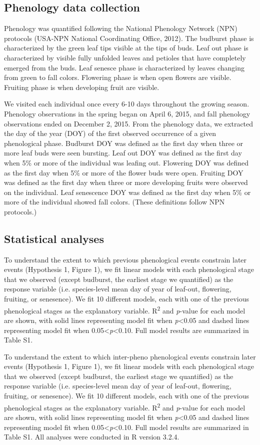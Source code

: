 \documentclass{article}
\begin{document}
\subsection*{Phenology data collection}
Phenology was quantified following the National Phenology Network (NPN) protocols (USA-NPN National Coordinating Office, 2012). The budburst phase is characterized by the green leaf tips visible at the tips of buds. Leaf out phase is characterized by visible fully unfolded leaves and petioles that have completely emerged from the buds. Leaf senesce phase is characterized by leaves changing from green to fall colors. Flowering phase is when open flowers are visible. Fruiting phase is when developing fruit are visible. 
\par We visited each individual once every 6-10 days throughout the growing season. Phenology observations in the spring began on April 6, 2015, and fall phenology observations ended on December 2, 2015.
From the phenology data, we extracted the day of the year (DOY) of the first observed occurrence of a given phenological phase. Budburst DOY was defined as the first day when three or more leaf buds were seen bursting. Leaf out DOY was defined as the first day when 5\% or more of the individual was leafing out. Flowering DOY was defined as the first day when 5\% or more of the flower buds were open. Fruiting DOY was defined as the first day when three or more developing fruits were observed on the individual. Leaf senescence DOY was defined as the first day when 5\% or more of the individual showed fall colors. (These definitions follow NPN protocols.)
\subsection*{Statistical analyses}
To understand the extent to which previous phenological events constrain later events (Hypothesis 1, Figure 1), we fit linear models with each phenological stage that we observed (except budburst, the earliest stage we quantified) as the response variable (i.e. species-level mean day of year of leaf-out, flowering, fruiting, or senesence).  We fit 10 different models, each with one of the previous phenological stages as the explanatory variable. R\textsuperscript{2} and \textit{p}-value for each model are shown, with solid lines representing model fit when \textit{p}<0.05 and dashed lines representing model fit when 0.05<\textit{p}<0.10. Full model results are summarized in Table S1.
\par To understand the extent to which inter-pheno phenological events constrain later events (Hypothesis 1, Figure 1), we fit linear models with each phenological stage that we observed (except budburst, the earliest stage we quantified) as the response variable (i.e. species-level mean day of year of leaf-out, flowering, fruiting, or senesence).  We fit 10 different models, each with one of the previous phenological stages as the explanatory variable. R\textsuperscript{2} and \textit{p}-value for each model are shown, with solid lines representing model fit when \textit{p}<0.05 and dashed lines representing model fit when 0.05<\textit{p}<0.10. Full model results are summarized in Table S1.
All analyses were conducted in R version 3.2.4.
\end{document}
